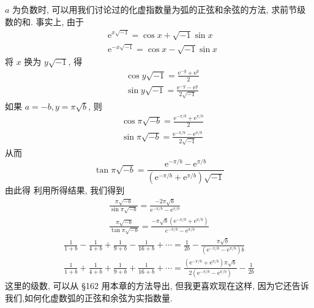 $a$ 为负数时, 可以用我们讨论过的化虚指数量为弧的正弦和余弦的方法, 求前节级 数的和. 事实上, 由于
\[
\begin{aligned}
& \mathrm{e}^{x \sqrt{-1}}=\cos x+\sqrt{-1} \sin x \\
& \mathrm{e}^{-x \sqrt{-1}}=\cos x-\sqrt{-1} \sin x
\end{aligned}
\]
将 $x$ 换为 $y \sqrt{-1}$, 得
\[
\begin{aligned}
& \cos y \sqrt{-1}=\frac{\mathrm{e}^{-y}+\mathrm{e}^{y}}{2} \\
& \sin y \sqrt{-1}=\frac{\mathrm{e}^{-y}-\mathrm{e}^{y}}{2 \sqrt{-1}}
\end{aligned}
\]
如果 $a=-b, y=\pi \sqrt{b}$, 则
\[
\begin{aligned}
& \cos \pi \sqrt{-b}=\frac{\mathrm{e}^{-\pi / b}+\mathrm{e}^{\pi / b}}{2} \\
& \sin \pi \sqrt{-b}=\frac{\mathrm{e}^{-\pi / b}-\mathrm{e}^{\pi / b}}{2 \sqrt{-1}}
\end{aligned}
\]
从而
\[
\tan \pi \sqrt{-b}=\frac{\mathrm{e}^{-\pi / b}-\mathrm{e}^{\pi / b}}{\left(\mathrm{e}^{-\pi / b}+\mathrm{e}^{\pi / b}\right) \sqrt{-1}}
\]
由此得 利用所得结果, 我们得到
\[
\begin{gathered}
\frac{\pi \sqrt{-b}}{\sin \pi \sqrt{-b}}=\frac{-2 \pi \sqrt{b}}{\mathrm{e}^{-\pi / b}-\mathrm{e}^{\pi / b}} \\
\frac{\pi \sqrt{-b}}{\tan \pi \sqrt{-b}}=\frac{-\pi \sqrt{b}\left(\mathrm{e}^{-\pi / b}+\mathrm{e}^{\pi / b}\right)}{e^{-\pi / b}-\mathrm{e}^{\pi / b}}
\end{gathered}
\]
\[
\begin{gathered}
\frac{1}{1+b}-\frac{1}{4+b}+\frac{1}{9+b}-\frac{1}{16+b}+\cdots=\frac{1}{2 b}-\frac{\pi \sqrt{b}}{\left(\mathrm{e}^{-\pi / b}-\mathrm{e}^{\pi / b}\right) b} \\
\frac{1}{1+b}+\frac{1}{4+b}+\frac{1}{9+b}+\frac{1}{16+b}+\cdots=\frac{\left(\mathrm{e}^{-\pi / b}+\mathrm{e}^{\pi / b}\right) \pi \sqrt{b}}{2\left(\mathrm{e}^{-\pi / b}-\mathrm{e}^{\pi / b}\right)}-\frac{1}{2 b}
\end{gathered}
\]
这里的级数, 可以从 §162 用本章的方法导出, 但我更喜欢现在这样, 因为它还告诉 我们,如何化虚数弧的正弦和余弦为实指数量. 

